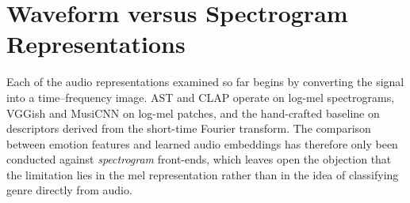 %
%
%
%

\section{Waveform versus Spectrogram Representations}
\label{sec:waveform}

Each of the audio representations examined so far begins by converting the signal into a
time--frequency image. AST and CLAP operate on log-mel spectrograms, VGGish and MusiCNN on
log-mel patches, and the hand-crafted baseline on descriptors derived from the short-time
Fourier transform. The comparison between emotion features and learned audio embeddings has
therefore only been conducted against \emph{spectrogram} front-ends, which leaves open the
objection that the limitation lies in the mel representation rather than in the idea of
classifying genre directly from audio.

